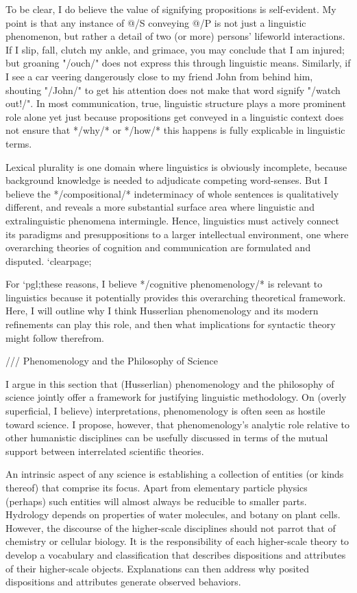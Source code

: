 To be clear, I do believe the value of signifying propositions is 
self-evident.  My point is that any instance of @/S conveying @/P 
is not just a linguistic phenomenon, but rather a detail of 
two (or more) persons' lifeworld interactions.  
If I slip, fall, clutch my ankle, and grimace, you may 
conclude that I am injured; but groaning "/ouch/" does not 
express this through linguistic means.  Similarly, if I see a 
car veering dangerously close to my friend John from behind him, shouting 
"/John/" to get his attention does not make that word signify 
"/watch out!/".  In most communication, true, linguistic structure 
plays a more prominent role %
alone %
yet just because propositions get conveyed 
in a linguistic context does not ensure that */why/* or */how/* this 
happens is fully explicable in linguistic terms.

Lexical plurality is one domain where 
linguistics is obviously incomplete, because background knowledge 
is needed to adjudicate competing word-senses.  But I believe 
the */compositional/* indeterminacy of whole sentences 
is qualitatively different, and reveals a more substantial 
surface area where linguistic and extralinguistic 
phenomena intermingle.  Hence, linguistics 
must actively connect its paradigms and presuppositions 
to a larger intellectual environment, one where 
overarching theories of cognition and communication 
are formulated and disputed. `clearpage;

For `pgl;these reasons, I believe */cognitive phenomenology/* is 
relevant to linguistics because it potentially provides this 
overarching theoretical framework.  Here, I will outline 
why I think Husserlian phenomenology and its modern 
refinements can play this role, 
and then what implications for syntactic theory might follow 
therefrom.


///   Phenomenology and the Philosophy of Science

I argue in this section that (Husserlian) phenomenology and the 
philosophy of science jointly offer a 
framework for justifying linguistic 
methodology.  On (overly superficial, I believe) interpretations, 
phenomenology is often seen as hostile toward science.  I propose, however, 
that phenomenology's analytic role relative to other humanistic 
disciplines can be usefully discussed in terms of the mutual support 
between interrelated scientific theories.

An intrinsic aspect of any science is establishing a collection of 
entities (or kinds thereof) that comprise its focus.  Apart from 
elementary particle physics (perhaps) such entities will almost 
always be reducible to smaller parts.  Hydrology depends on 
properties of water molecules, and botany on plant cells.  
However, the discourse of the higher-scale disciplines should 
not parrot that of chemistry or cellular biology.  It is the 
responsibility of each higher-scale theory to develop a 
vocabulary and classification that describes dispositions 
and attributes of their higher-scale objects.  Explanations can 
then address why posited dispositions and attributes 
generate observed behaviors.


